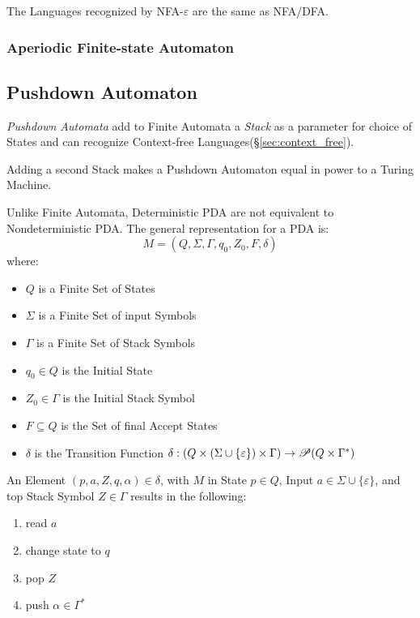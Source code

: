 The Languages recognized by NFA-$\varepsilon$ are the same as NFA/DFA.



\subsubsection{Aperiodic Finite-state Automaton}
\label{sec:aperiodic_automaton}



\subsection{Pushdown Automaton}\label{sec:pushdown_automaton}

\emph{Pushdown Automata} add to Finite Automata a \emph{Stack} as a
parameter for choice of States and can recognize Context-free
Languages(\S\ref{sec:context_free}).

Adding a second Stack makes a Pushdown Automaton equal in power to a
Turing Machine.

Unlike Finite Automata, Deterministic PDA are not equivalent to
Nondeterministic PDA. The general representation for a PDA is:
\[
  M = (Q, \Sigma, \Gamma, q_0, Z_0, F, \delta)
\]
where:
\begin{itemize}
  \item $Q$ is a Finite Set of States
  \item $\Sigma$ is a Finite Set of input Symbols
  \item $\Gamma$ is a Finite Set of Stack Symbols
  \item $q_0 \in Q$ is the Initial State
  \item $Z_0 \in \Gamma$ is the Initial Stack Symbol
  \item $F \subseteq Q$ is the Set of final Accept States
  \item $\delta$ is the Transition Function $\delta: (Q \times (\Sigma
    \cup \{\varepsilon\}) \times \Gamma) \rightarrow \mathscr{P}(Q \times
    \Gamma^*)$
\end{itemize}

An Element $(p,a,Z,q,\alpha)\in\delta$, with $M$ in State $p \in Q$,
Input $a \in \Sigma \cup \{\varepsilon\}$, and top Stack Symbol $Z \in
\Gamma$ results in the following:
\begin{enumerate}
  \item read $a$
  \item change state to $q$
  \item pop $Z$
  \item push $\alpha \in \Gamma^*$
\end{enumerate}



